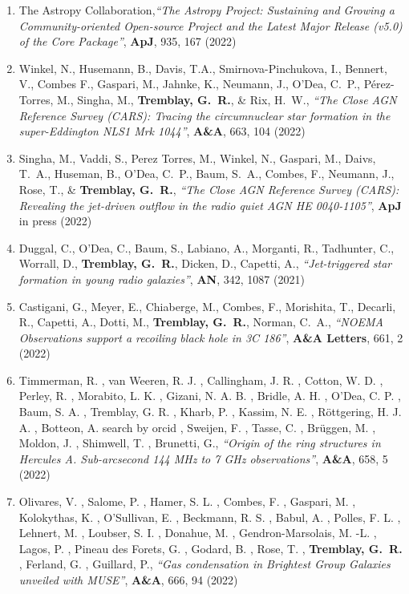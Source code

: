 \documentclass[11pt]{article}
\begin{document}
\begin{enumerate}[resume]
\item The Astropy Collaboration,\textit{``The Astropy Project: Sustaining and Growing a Community-oriented Open-source Project and the Latest Major Release (v5.0) of the Core Package''}, \textbf{ApJ}, 935, 167 (2022)

\item Winkel, N., Husemann, B., Davis, T.A., Smirnova-Pinchukova, I., Bennert, V., Combes F., Gaspari, M., Jahnke, K., Neumann, J., O'Dea, C.~P., P\'{e}rez-Torres, M., Singha, M., \textbf{Tremblay, G.~R.}, \& Rix, H.~W., \textit{``The Close AGN Reference Survey (CARS): Tracing the circumnuclear star formation in the super-Eddington NLS1 Mrk 1044''}, \textbf{A\&A}, 663, 104  (2022)

\item Singha, M., Vaddi, S., Perez Torres, M., Winkel, N., Gaspari, M., Daivs, T.~A., Huseman, B., O'Dea, C.~P., Baum, S.~A., Combes, F., Neumann, J., Rose, T., \& \textbf{Tremblay, G.~R.}, \textit{``The Close AGN Reference Survey (CARS): Revealing the jet-driven outflow in the radio quiet AGN HE 0040-1105''}, \textbf{ApJ} in press (2022)

\item Duggal, C., O'Dea, C., Baum, S., Labiano, A., Morganti, R., Tadhunter, C., Worrall, D., \textbf{Tremblay, G.~R.}, Dicken, D., Capetti, A., \textit{``Jet-triggered star formation in young radio galaxies''}, \textbf{AN}, 342, 1087 (2021)

\item Castigani, G., Meyer, E., Chiaberge, M., Combes, F., Morishita, T., Decarli, R., Capetti, A., Dotti, M., \textbf{Tremblay, G.~R.}, Norman, C.~A., \textit{``NOEMA Observations support a recoiling black hole in 3C 186''}, \textbf{A\&A Letters}, 661, 2 (2022)

\item Timmerman, R. , van Weeren, R. J. , Callingham, J. R. , Cotton, W. D. , Perley, R. , Morabito, L. K. , Gizani, N. A. B. , Bridle, A. H. , O'Dea, C. P. , Baum, S. A. , Tremblay, G. R. , Kharb, P. , Kassim, N. E. , R\"{o}ttgering, H. J. A. , Botteon, A. search by orcid , Sweijen, F. , Tasse, C. , Br\"{u}ggen, M. , Moldon, J. , Shimwell, T. , Brunetti, G., \textit{``Origin of the ring structures in Hercules A. Sub-arcsecond 144 MHz to 7 GHz observations''}, \textbf{A\&A}, 658, 5 (2022)

\item Olivares, V. , Salome, P. , Hamer, S. L. , Combes, F. , Gaspari, M. , Kolokythas, K. , O'Sullivan, E. , Beckmann, R. S. , Babul, A. , Polles, F. L. , Lehnert, M. , Loubser, S. I. , Donahue, M. , Gendron-Marsolais, M. -L. , Lagos, P. , Pineau des Forets, G. , Godard, B. , Rose, T. , \textbf{Tremblay, G.~R.} , Ferland, G. , Guillard, P., \textit{``Gas condensation in Brightest Group Galaxies unveiled with MUSE''}, \textbf{A\&A}, 666, 94 (2022)


\end{enumerate}
\end{document}
